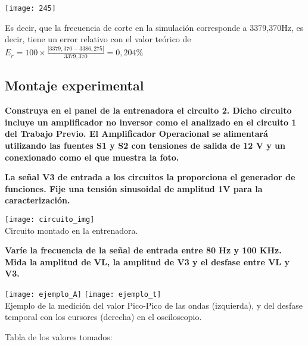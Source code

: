 \documentclass{article}
\begin{document}
\centerline{\texttt{[image: 245]}}

Es decir, que la frecuencia de corte en la simulación corresponde a 3379,370Hz, es decir, tiene un error relativo con el valor teórico de 
$E_r=100\times\frac{|3379,370-3386,275|}{3379,370}=0,204\%$
\cleardoublepage

\begin{center}
\section{Montaje experimental}
\end{center}

\textbf{Construya en el panel de la entrenadora el circuito 2. Dicho circuito incluye un
amplificador no inversor como el analizado en el circuito 1 del Trabajo Previo. El Amplificador
Operacional se alimentará utilizando las fuentes S1 y S2 con tensiones de salida de 12 V y un
conexionado como el que muestra la foto.}

\textbf{La señal V3 de entrada a los circuitos la proporciona el generador de funciones. Fije una
tensión sinusoidal de amplitud 1V para la caracterización.}
\bigskip
\begin{center}
\texttt{[image: circuito\_img]}\\
Circuito montado en la entrenadora.
\end{center}

\textbf{Varíe la frecuencia de la señal de entrada entre 80 Hz y 100 KHz. Mida la amplitud de
VL, la amplitud de V3 y el desfase entre VL y V3.}

\begin{center}
\texttt{[image: ejemplo\_A]} 
\texttt{[image: ejemplo\_t]}\\
Ejemplo de la medición del valor Pico-Pico de las ondas (izquierda), y del desfase temporal con los cursores (derecha) en el osciloscopio.
\end{center}
 
\cleardoublepage

Tabla de los valores tomados:
\end{document}

